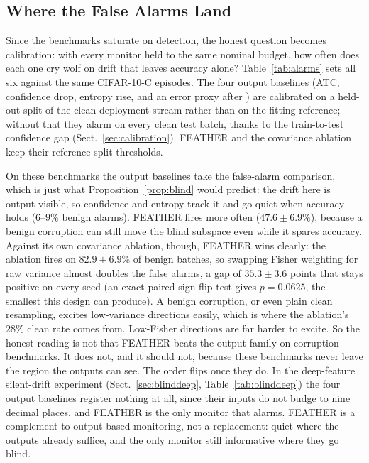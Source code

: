 \documentclass[graybox]{SNmult}
\begin{document}
\subsection{Where the False Alarms Land}

Since the benchmarks saturate on detection, the honest question becomes
calibration: with every monitor held to the same nominal budget, how often
does each one cry wolf on drift that leaves accuracy alone?
Table~\ref{tab:alarms} sets all six against the same CIFAR-10-C episodes. The
four output baselines (ATC, confidence drop, entropy rise, and an error proxy
after \cite{amoukou2024sequential}) are calibrated on a held-out split of the
clean deployment stream rather than on the fitting reference; without that
they alarm on every clean test batch, thanks to the train-to-test confidence
gap (Sect.~\ref{sec:calibration}). FEATHER and the covariance ablation keep
their reference-split thresholds.

On these benchmarks the output baselines take the false-alarm comparison,
which is just what Proposition~\ref{prop:blind} would predict: the drift here
is output-visible, so confidence and entropy track it and go quiet when
accuracy holds ($6$--$9\%$ benign alarms). FEATHER fires more often
($47.6 \pm 6.9\%$), because a benign corruption can still move the blind
subspace even while it spares accuracy. Against its own covariance ablation,
though, FEATHER wins clearly: the ablation fires on $82.9 \pm 6.9\%$ of benign
batches, so swapping Fisher weighting for raw variance almost doubles the
false alarms, a gap of $35.3 \pm 3.6$ points that stays positive on every seed
(an exact paired sign-flip test gives $p = 0.0625$, the smallest this design
can produce). A benign corruption, or even plain clean resampling, excites
low-variance directions easily, which is where the ablation's $28\%$ clean
rate comes from. Low-Fisher directions are far harder to excite. So the honest
reading is not that FEATHER beats the output family on corruption benchmarks.
It does not, and it should not, because these benchmarks never leave the
region the outputs can see. The order flips once they do. In the deep-feature
silent-drift experiment (Sect.~\ref{sec:blinddeep},
Table~\ref{tab:blinddeep}) the four output baselines register nothing at all,
since their inputs do not budge to nine decimal places, and FEATHER is the
only monitor that alarms. FEATHER is a complement to output-based monitoring,
not a replacement: quiet where the outputs already suffice, and the only
monitor still informative where they go blind.
\end{document}
